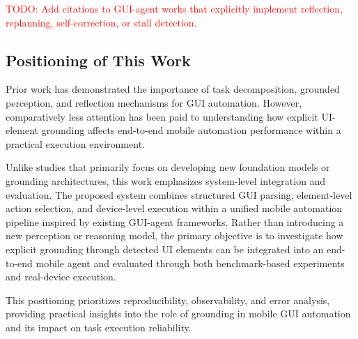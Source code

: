 \textcolor{red}{TODO: Add citations to GUI-agent works that explicitly implement reflection, replanning, self-correction, or stall detection.}

\subsection{Positioning of This Work}

Prior work has demonstrated the importance of task decomposition, grounded perception, and reflection mechanisms for GUI automation. However, comparatively less attention has been paid to understanding how explicit UI-element grounding affects end-to-end mobile automation performance within a practical execution environment.

Unlike studies that primarily focus on developing new foundation models or grounding architectures, this work emphasizes system-level integration and evaluation. The proposed system combines structured GUI parsing, element-level action selection, and device-level execution within a unified mobile automation pipeline inspired by existing GUI-agent frameworks. Rather than introducing a new perception or reasoning model, the primary objective is to investigate how explicit grounding through detected UI elements can be integrated into an end-to-end mobile agent and evaluated through both benchmark-based experiments and real-device execution.

This positioning prioritizes reproducibility, observability, and error analysis, providing practical insights into the role of grounding in mobile GUI automation and its impact on task execution reliability.
